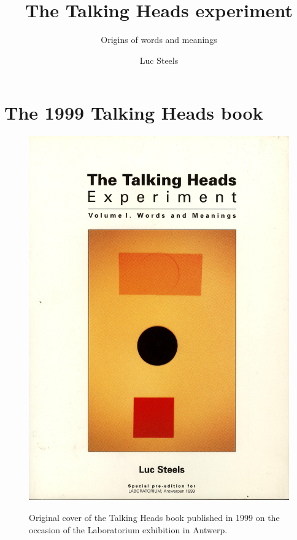 \documentclass[ number=1
			   ,series=cmle
			   ,url=http://langsci-press.org/catalog/book/49 
			   ,isbn=978-3-944675-42-8
			   ,output=short   %
			   ,smallfont
			   ,biblatex
			  ]{LSP/langsci}
\title{The Talking Heads experiment}
\subtitle{Origins of words and meanings}
\author{Luc Steels}
\begin{document}
 


\maketitle                
\frontmatter

\tableofcontents    

\mainmatter 

\part{The 1999 Talking Heads book} \label{part:1}

\begin{figure}[htbp]
  \centerline{\includegraphics[width=.95\textwidth]{extra/figs/cover-original-book.pdf}}
  
{ Original cover of the Talking Heads book published in 1999 on the occasion of the 
Laboratorium exhibition in Antwerp.}
\end{figure}







%
\end{document}
